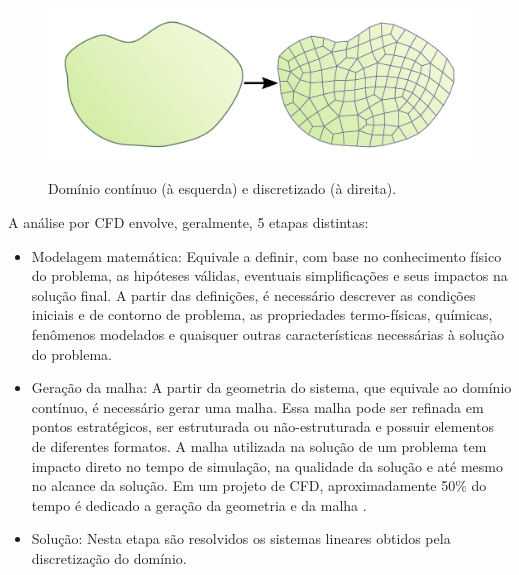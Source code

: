 \begin{figure}[htb]
  \caption[Domínio contínuo e discretizado.]{Domínio contínuo (à esquerda) e discretizado (à direita).}
  \centering\includegraphics[scale=1.3]{figuras/dom.png}
  \label{fig:dom}
\end{figure}

A análise por CFD envolve, geralmente, 5 etapas distintas:

\begin{itemize}
\item Modelagem matemática: Equivale a definir, com base no conhecimento
  físico do problema, as hipóteses válidas, eventuais simplificações e
  seus impactos na solução final. A partir das definições, é necessário
  descrever as condições iniciais e de contorno de problema, as propriedades
  termo-físicas, químicas, fenômenos modelados e quaisquer outras características
  necessárias à solução do problema.
\item Geração da malha: A partir da geometria do sistema, que equivale ao
  domínio contínuo, é necessário gerar uma malha. Essa malha pode ser refinada
  em pontos estratégicos, ser estruturada ou não-estruturada e possuir elementos
  de diferentes formatos. A malha utilizada na solução de um problema tem impacto
  direto no tempo de simulação, na qualidade da solução e até mesmo no alcance
  da solução. Em um projeto de CFD, aproximadamente 50\% do tempo é dedicado a geração
  da geometria e da malha \cite{Versteeg2007}.
\item Solução: Nesta etapa são resolvidos os sistemas lineares obtidos pela
  discretização do domínio.
\end{itemize}



